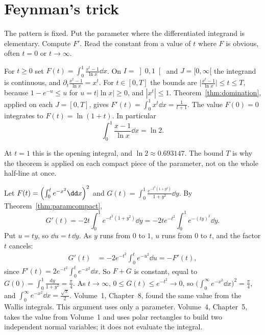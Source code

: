 \section{Feynman's trick}

The pattern is fixed. Put the parameter where the differentiated integrand is elementary. Compute $F'$. Read the constant from a value of $t$ where $F$ is obvious, often $t=0$ or $t\to\infty$.

\begin{example}\label{ex:logint}
For $t\ge0$ set $F(t)=\int_0^1\frac{x^t-1}{\ln x}\dd x$. On $I=\left]0,1\right[$ and $J=[0,\infty[$ the integrand is continuous, and $\partial_t\frac{x^t-1}{\ln x}=x^t$. For $t\in[0,T]$ the bounds are $\bigl|\frac{x^t-1}{\ln x}\bigr|\le t\le T$, because $1-e^{-u}\le u$ for $u=t|\ln x|\ge0$, and $|x^t|\le1$. Theorem~\ref{thm:domination}, applied on each $J=[0,T]$, gives $F'(t)=\int_0^1x^t\dd x=\frac1{t+1}$. The value $F(0)=0$ integrates to $F(t)=\ln(1+t)$. In particular
\[
\int_0^1\frac{x-1}{\ln x}\dd x=\ln2.
\]
\end{example}

At $t=1$ this is the opening integral, and $\ln 2\approx0.693147$. The bound $T$ is why the theorem is applied on each compact piece of the parameter, not on the whole half-line at once.

\begin{example}\label{ex:gaussfeynman}
Let $F(t)=\Bigl(\int_0^te^{-x^2}\dd x\Bigr)^2$ and $G(t)=\int_0^1\frac{e^{-t^2(1+y^2)}}{1+y^2}\dd y$. By Theorem~\ref{thm:paramcompact},
\[
G'(t)=-2t\int_0^1e^{-t^2(1+y^2)}\dd y=-2te^{-t^2}\int_0^1e^{-(ty)^2}\dd y.
\]
Put $u=ty$, so $\dd u=t\,\dd y$. As $y$ runs from $0$ to $1$, $u$ runs from $0$ to $t$, and the factor $t$ cancels:
\[
\begin{aligned}G'(t)&=-2e^{-t^2}\int_0^te^{-u^2}\dd u=-F'(t),\end{aligned}
\]
since $F'(t)=2e^{-t^2}\int_0^te^{-x^2}\dd x$. So $F+G$ is constant, equal to $G(0)=\int_0^1\frac{\mathrm dy}{1+y^2}=\frac\pi4$. As $t\to\infty$, $0\le G(t)\le e^{-t^2}\to0$, so
$\bigl(\int_0^\infty e^{-x^2}\dd x\bigr)^2=\frac\pi4$, and $\int_0^\infty e^{-x^2}\dd x=\frac{\sqrt\pi}2$. Volume~1, Chapter~8, found the same value from the Wallis integrals. This argument uses only a parameter. Volume~4, Chapter~5, takes the value from Volume~1 and uses polar rectangles to build two independent normal variables; it does not evaluate the integral.
\end{example}

